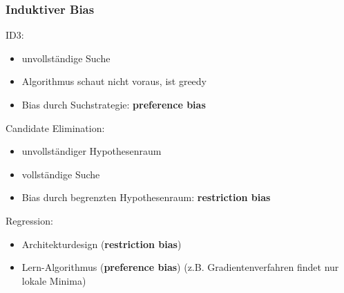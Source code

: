 	\subsubsection{Induktiver Bias}
	ID3:
	\begin{itemize}
		\item unvollständige Suche
		\item Algorithmus schaut nicht voraus, ist \dq greedy\dq
		\item Bias durch Suchstrategie: \textbf{preference bias}
	\end{itemize}
	Candidate Elimination:
	\begin{itemize}
		\item unvollständiger Hypothesenraum
		\item vollständige Suche
		\item Bias durch begrenzten Hypothesenraum: \textbf{restriction bias}
	\end{itemize}
	Regression:
	\begin{itemize}
		\item Architekturdesign (\textbf{restriction bias})
		\item Lern-Algorithmus (\textbf{preference bias}) (z.B. Gradientenverfahren findet nur lokale Minima)
	\end{itemize}
